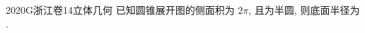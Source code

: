 
\begin{problem}{2020}{G}{浙江卷}{14}{立体几何}
已知圆锥展开图的侧面积为 $ 2\pi $, 且为半圆, 则底面半径为 \underline{\hspace{4em}}.
\end{problem}

\begin{answer}

\end{answer}

\begin{solutions}

\end{solutions}